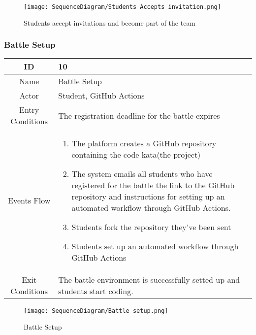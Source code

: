 \begin{figure}[H]
  \texttt{[image: SequenceDiagram/Students Accepts invitation.png]} 
  \caption{Students accept invitations and become part of the team}
  \label{fig:immagine}
\end{figure}


\newpage
\subsubsection{Battle Setup}

\begin{longtable}{|c| p{10cm}|}
        \hline
            ID & 10 \\
        \hline
            Name & Battle Setup \\
        \hline
            Actor & Student, GitHub Actions \\
        \hline
            Entry Conditions & 
                     The registration deadline  for the battle expires
        
         \\
        \hline
            Events Flow &   \begin{enumerate}
                                \item The platform creates a GitHub repository containing the code kata(the project)
                                \item The system emails all students who have registered for the battle the link to the GitHub repository and instructions for setting up an automated workflow through GitHub Actions.
                                \item  Students fork the repository they've been sent
                                \item  Students  set up an automated workflow through GitHub Actions 
                            \end{enumerate} \\
                            \hline
            Exit Conditions &
    
                             
                                    The battle environment  is successfully setted up and  students start coding.
                                \\
        \hline
            
    \end{longtable}

    \begin{figure}[H]
  \texttt{[image: SequenceDiagram/Battle setup.png]} 
  \caption{Battle Setup}
  \label{fig:immagine}
\end{figure}




